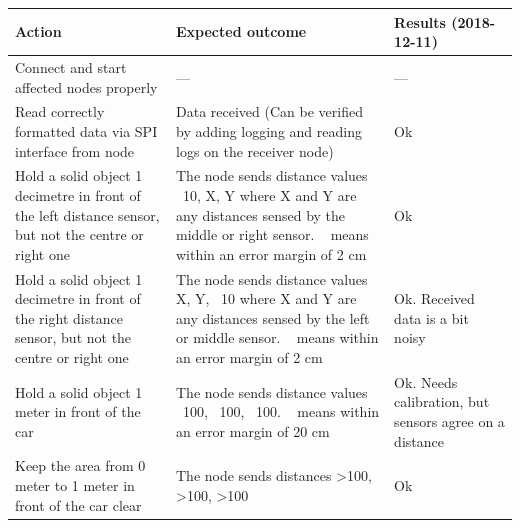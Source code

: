 \documentclass[11pt, titlepage]{article} %
\begin{document}
\begin{table}[H]
 \label{tab:title}
\centering
\begin{tabular}{|m{5cm}|m{5cm}|m{5cm}|}
\hline
Action & Expected outcome & Results (2018-12-11) \\ \hline
Connect and start affected nodes properly	  & ---      & ---  \\ \hline
Read correctly formatted data via SPI interface from node  & Data received (Can be verified by adding logging and reading logs on the receiver node)      & Ok  \\ \hline
Hold a solid object 1 decimetre in front of the left distance sensor, but not the centre or right one  &  The node sends distance values ~10, X, Y where X and Y are any distances sensed by the middle or right sensor. ~ means within an error margin of 2 cm     & Ok  \\ \hline
Hold a solid object 1 decimetre in front of the right distance sensor, but not the centre or right one  & The node sends distance values X, Y, ~10 where X and Y are any distances sensed by the left or middle sensor. ~ means within an error margin of 2 cm      & Ok. Received data is a bit noisy  \\ \hline
Hold a solid object 1 meter in front of the car  &  The node sends distance values ~100, ~100, ~100. ~ means within an error margin of 20 cm     & Ok. Needs calibration, but sensors agree on a distance  \\ \hline
Keep the area from 0 meter to 1 meter in front of the car clear  & The node sends distances \textgreater100, \textgreater100, \textgreater100      & Ok  \\ \hline

\end{tabular}
\end{table}
\end{document}
